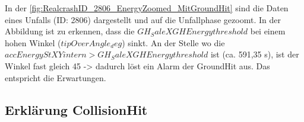In der \autoref{fig:RealcrashID_2806_EnergyZoomed_MitGroundHit} sind die Daten eines Unfalls (ID: 2806) dargestellt und auf die Unfallphase gezoomt. In der Abbildung ist zu erkennen, dass die $GH_SaleXGHEnergythreshold$ bei einem hohen Winkel ($tipOverAngle_deg$) sinkt. An der Stelle wo die $accEnergyStXYintern > GH_SaleXGHEnergythreshold$ ist (ca. 591,35 s), ist der Winkel fast gleich 45 -> dadurch löst ein Alarm der GroundHit aus. Das entspricht die Erwartungen.




\subsection{Erklärung CollisionHit}
%
%
%
%

%
%
%
%




















%
%
%
%
%
%
%
%
%
%

